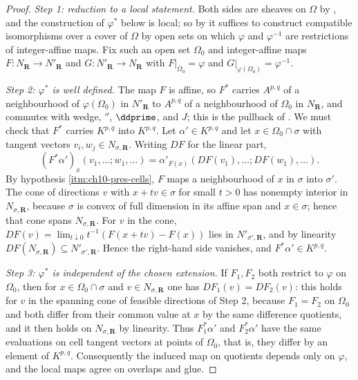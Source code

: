 \begin{proof}
\emph{Step 1: reduction to a local statement.}
Both sides are sheaves on $\Omega$ by , and the
construction of $\varphi^*$ below is local; so by
 it suffices to construct compatible
isomorphisms over a cover of $\Omega$ by open sets on which $\varphi$ and
$\varphi^{-1}$ are restrictions of integer-affine maps.  Fix such an open
set $\Omega_0$ and integer-affine maps $F:N_{\mathbf R}\to N'_{\mathbf R}$
and $G:N'_{\mathbf R}\to N_{\mathbf R}$ with $F|_{\Omega_0}=\varphi$ and
$G|_{\varphi(\Omega_0)}=\varphi^{-1}$.

\emph{Step 2: $\varphi^*$ is well defined.}
The map $F$ is affine, so $F^*$ carries $A^{p,q}$ of a neighbourhood of
$\varphi(\Omega_0)$ in $N'_{\mathbf R}$ to $A^{p,q}$ of a neighbourhood of
$\Omega_0$ in $N_{\mathbf R}$, and commutes with wedge, $\dprime$,
$\ddprime$, and $J$; this is the pullback of .  We
must check that $F^*$ carries $K^{p,q}$ into $K^{p,q}$.  Let
$\alpha'\in K^{p,q}$ and let $x\in\Omega_0\cap\sigma$ with tangent vectors
$v_i,w_j\in N_{\sigma,\mathbf R}$.  Writing $DF$ for the linear part,
\[
 (F^*\alpha')_x(v_1,\ldots;w_1,\ldots)
 =\alpha'_{F(x)}(DF(v_1),\ldots;DF(w_1),\ldots).
\]
By hypothesis \cref{itm:ch10-pres-cells}, $F$ maps a neighbourhood of $x$ in
$\sigma$ into $\sigma'$.  The cone of directions $v$ with $x+tv\in\sigma$ for
small $t>0$ has nonempty interior in $N_{\sigma,\mathbf R}$, because $\sigma$
is convex of full dimension in its affine span and $x\in\sigma$; hence that
cone spans $N_{\sigma,\mathbf R}$.  For $v$ in the cone,
$DF(v)=\lim_{t\downarrow0}t^{-1}(F(x+tv)-F(x))$ lies in
$N'_{\sigma',\mathbf R}$, and by linearity
$DF(N_{\sigma,\mathbf R})\subseteq N'_{\sigma',\mathbf R}$.  Hence the
right-hand side vanishes, and $F^*\alpha'\in K^{p,q}$.

\emph{Step 3: $\varphi^*$ is independent of the chosen extension.}
If $F_1,F_2$ both restrict to $\varphi$ on $\Omega_0$, then for
$x\in\Omega_0\cap\sigma$ and $v\in N_{\sigma,\mathbf R}$ one has
$DF_1(v)=DF_2(v)$: this holds for $v$ in the spanning cone of feasible
directions of Step 2, because $F_1=F_2$ on $\Omega_0$ and both differ from
their common value at $x$ by the same difference quotients, and it then holds
on $N_{\sigma,\mathbf R}$ by linearity.  Thus $F_1^*\alpha'$ and
$F_2^*\alpha'$ have the same evaluations on cell tangent vectors at points of
$\Omega_0$, that is, they differ by an element of $K^{p,q}$.  Consequently
the induced map on quotients depends only on $\varphi$, and the local maps
agree on overlaps and glue.


\end{proof}
